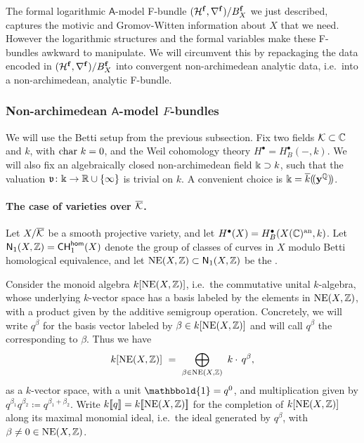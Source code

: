\documentclass[twoside,leqno]{article}
\numberwithin{equation}{section}
\theoremstyle{plain}
\theoremstyle{definition}
\begin{document}
The formal logarithmic $\mathsf{A}$-model F-bundle $(\mathcal H^{\mathbf{f}},\nabla^{\mathbf{f}})/B_{X}^{\mathbf{f}}$ we just described, captures the motivic and Gromov-Witten information  about $X$ that we need. However the logarithmic structures and the formal variables make these F-bundles awkward to manipulate. We will circumvent this by repackaging the data  encoded in $(\mathcal H^{\mathbf{f}},\nabla^{\mathbf{f}})/B_{X}^{\mathbf{f}}$ into convergent non-archimedean analytic data, i.e.\ into a non-archimedean, analytic F-bundle.

\subsubsection{Non-archimedean \texorpdfstring{$\mathsf{A}$}{A}-model \texorpdfstring{$F$}{F}-bundles} \label{sssec:AmodelF}

We will use the Betti setup from the previous subsection. 
Fix two fields $\mathcal K \subset \mathbb C$ and $k$, with $\operatorname{char} \, k =0$, and the
Weil cohomology theory $H^{\bullet} = H^{\bullet}_{B}(-,k)$. We will also fix an algebraically closed non-archimedean field $\Bbbk \supset k$, such that the valuation $\mathfrak{v}  \colon \Bbbk \to \mathbb R\cup \{\infty\}$ is trivial on $k$. A convenient choice is $\Bbbk=\overline{k}(\!(\mathbf{y}^{\mathbb Q})\!)$.

\paragraph{The case of varieties over $\overline{\mathcal K}$.}  \label{par:casekaybar}

Let 
$X/\overline{\mathcal K}$ be a smooth projective variety, and let 
$H^{\bullet}(X) = H^{\bullet}_{B}(X(\mathbb C)^{\operatorname{an}},k)$. Let 
 $\mathsf{N}_{1}(X,\mathbb Z) = 
\mathsf{CH}^{\mathsf{hom}}_{1}(X)$ denote the group of classes of curves in $X$ modulo Betti homological equivalence, and let 
$\operatorname{NE}(X,\mathbb Z) \subset \mathsf{N}_{1}(X,\mathbb Z)$ be the .  

Consider the monoid algebra $k[\operatorname{NE}(X,\mathbb Z)]$, i.e.\ the commutative unital $k$-algebra, whose underlying 
$k$-vector space has a basis labeled by the elements in 
$\operatorname{NE}(X,\mathbb Z)$, with a product given by the additive semigroup operation. Concretely, we will write $q^{\beta}$ for the basis vector labeled by $\beta \in k[\operatorname{NE}(X,\mathbb Z)]$ and will call $q^{\beta}$  the  corresponding to $\beta$. Thus we have
\[
k[\NE(X,\bbZ)] \  =  \ \bigoplus_{\beta \in \NE(X,\bbZ)} \ k\cdot \, q^{\beta},
\]
as a $k$-vector space, with a unit $\mathbbold{1} = q^0$, and multiplication given by $q^{\beta_{1}}q^{\beta_{2}} \coloneqq  q^{\beta_{1} + \beta_{2}}$. Write $k[\![q]\!] = k[\![\operatorname{NE}(X,\mathbb Z)]\!]$ for  the completion of $k[\operatorname{NE}(X,\mathbb Z)]$ along its maximal monomial ideal, i.e.\ the ideal generated by $q^\beta$, with $\beta \neq 0 \in\operatorname{NE}(X,\mathbb Z)$.
\end{document}
